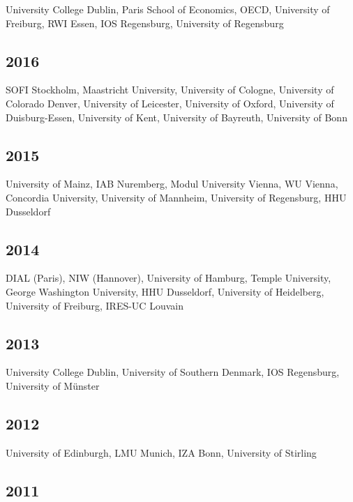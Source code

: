 \documentclass[10pt,a4paper,]{article}
\begin{document}
University College Dublin, Paris School of Economics, OECD, University
of Freiburg, RWI Essen, IOS Regensburg, University of Regensburg

\hypertarget{section-7}{%
\subsection{2016}\label{section-7}}

SOFI Stockholm, Maastricht University, University of Cologne, University
of Colorado Denver, University of Leicester, University of Oxford,
University of Duisburg-Essen, University of Kent, University of
Bayreuth, University of Bonn

\hypertarget{section-8}{%
\subsection{2015}\label{section-8}}

University of Mainz, IAB Nuremberg, Modul University Vienna, WU Vienna,
Concordia University, University of Mannheim, University of Regensburg,
HHU Dusseldorf

\hypertarget{section-9}{%
\subsection{2014}\label{section-9}}

DIAL (Paris), NIW (Hannover), University of Hamburg, Temple University,
George Washington University, HHU Dusseldorf, University of Heidelberg,
University of Freiburg, IRES-UC Louvain

\hypertarget{section-10}{%
\subsection{2013}\label{section-10}}

University College Dublin, University of Southern Denmark, IOS
Regensburg, University of Münster

\hypertarget{section-11}{%
\subsection{2012}\label{section-11}}

University of Edinburgh, LMU Munich, IZA Bonn, University of Stirling

\hypertarget{section-12}{%
\subsection{2011}\label{section-12}}
\end{document}
